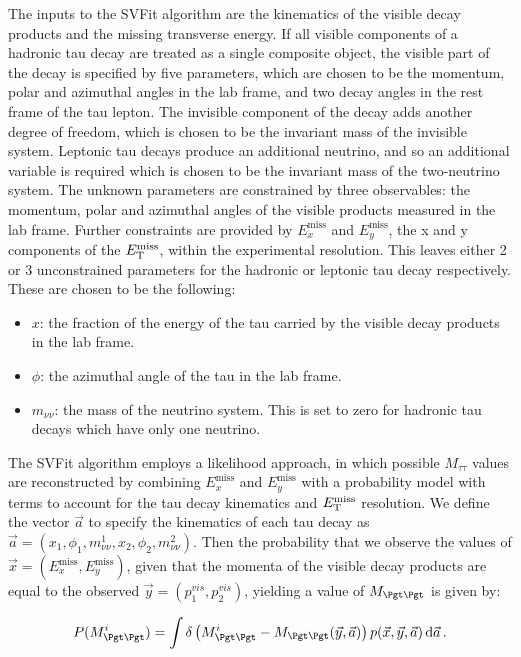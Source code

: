 The inputs to the SVFit algorithm are the kinematics of the visible decay
products and the missing transverse energy. If all visible components of a
hadronic tau decay are treated as a single composite object, the visible part of
the decay is specified by five parameters, which are chosen to be the momentum,
polar and azimuthal angles in the lab frame, and two decay angles in the rest
frame of the tau lepton. The invisible component of the decay adds another
degree of freedom, which is chosen to be the invariant mass of the invisible
system. Leptonic tau decays produce an additional neutrino, and so an additional
variable is required which is chosen to be the invariant mass of the
two-neutrino system. The unknown parameters are constrained by three
observables: the momentum, polar and azimuthal angles of the visible products
measured in the lab frame. Further constraints are provided by
$E_{x}^{\text{miss}}$ and $E_{y}^{\text{miss}}$, the x and y components of the
$E_{\mathrm{T}}^{\text{miss}}$, within the experimental resolution. This leaves either 2 or 3 
unconstrained parameters for the hadronic or leptonic tau decay respectively. 
These are chosen to be the following:

\begin{itemize}
\item $x$: the fraction of the energy of the tau carried by the visible decay
products in the lab frame.
\item $\phi$: the azimuthal angle of the tau in the lab frame. 
\item $m_{\nu\nu}$: the mass of the neutrino system. This is set to zero for hadronic tau
decays which have only one neutrino.
\end{itemize}

The SVFit algorithm employs a likelihood approach, in which possible
$M_{\tau\tau}$ values are reconstructed by combining $E_{x}^{\text{miss}}$ and
$E_{y}^{\text{miss}}$ with a probability model with terms to account for the tau
decay kinematics and $E_{\mathrm{T}}^{\text{miss}}$ resolution. We define the vector $\vec{a}$ to
specify the kinematics of each tau decay as $\vec{a} =
\left(x_{1},\phi_{1},m_{\nu\nu}^{1},x_{2},\phi_{2},m_{\nu\nu}^{2}\right)$. Then the
probability that we observe the values of $\vec{x} = \left(E_{x}^{\text{miss}},
E_{y}^{\text{miss}}\right)$, given that the momenta of the visible decay products are
equal to the observed $\vec{y} = \left(p_{1}^{vis},p_{2}^{vis} \right)$,
yielding a value of $M_{\Pgt\Pgt}$ is given by: 

\begin{equation} \label{eqn:svfit-prob}
P(M_{\Pgt\Pgt}^{i}) = \int\delta\left(M_{\Pgt\Pgt}^{i} -
M_{\Pgt\Pgt}(\vec{y},\vec{a})\right)p(\vec{x},\vec{y},\vec{a})\,\text{d}\vec{a}\,
.
\end{equation}


